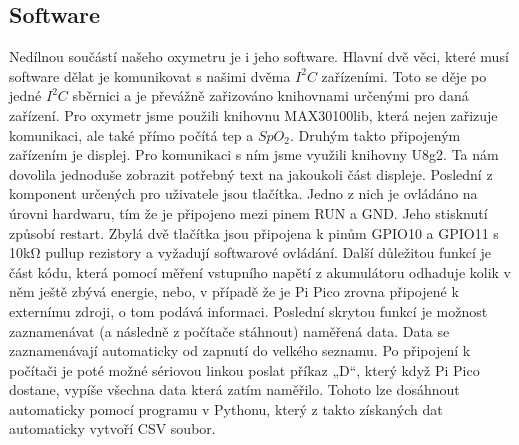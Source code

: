 \subsection {Software}
Nedílnou součástí našeho oxymetru je i jeho software. Hlavní dvě věci, které musí software dělat je komunikovat s našimi dvěma $I^2C$ zařízeními. Toto se děje po jedné $I^2C$ sběrnici a je převážně zařizováno knihovnami určenými pro daná zařízení. Pro oxymetr jsme použili knihovnu MAX30100lib, která nejen zařizuje komunikaci, ale také přímo počítá tep a $SpO_2$. Druhým takto připojeným zařízením je displej. Pro komunikaci s ním jsme využili knihovny U8g2. Ta nám dovolila jednoduše zobrazit potřebný text na jakoukoli část displeje. Poslední z komponent určených pro uživatele jsou tlačítka. Jedno z nich je ovládáno na úrovni hardwaru, tím že je připojeno mezi pinem RUN a GND.  Jeho stisknutí způsobí restart. Zbylá dvě tlačítka jsou připojena k pinům GPIO10 a GPIO11 s 10kΩ pullup rezistory a vyžadují softwarové ovládání. Další důležitou funkcí je část kódu, která pomocí měření vstupního napětí z akumulátoru odhaduje kolik v něm ještě zbývá energie, nebo, v případě že je Pi Pico zrovna připojené k externímu zdroji, o tom podává informaci. Poslední skrytou funkcí je možnost zaznamenávat (a následně z počítače stáhnout) naměřená data. Data se zaznamenávají automaticky od zapnutí do velkého seznamu. Po připojení k počítači je poté možné sériovou linkou poslat příkaz „D“, který když Pi Pico dostane, vypíše všechna data která zatím naměřilo. Tohoto lze dosáhnout automaticky pomocí programu v Pythonu, který z takto získaných dat automaticky vytvoří CSV soubor.